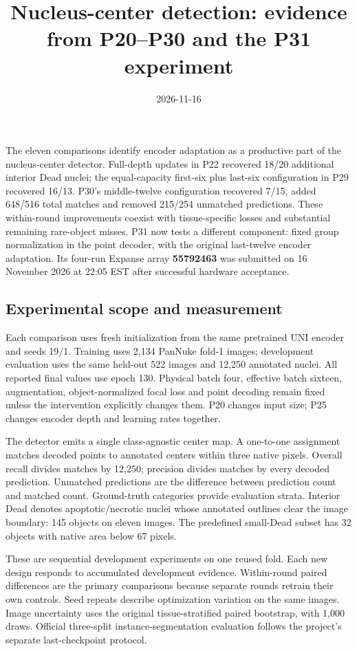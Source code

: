 \documentclass[
  11pt,
]{article}
\title{Nucleus-center detection: evidence from P20--P30 and the P31
experiment}
\author{}
\date{2026-11-16}
\begin{document}
\maketitle

{
\setcounter{tocdepth}{2}
\tableofcontents
}
The eleven comparisons identify encoder adaptation as a productive part
of the nucleus-center detector. Full-depth updates in P22 recovered
18/20 additional interior Dead nuclei; the equal-capacity first-six plus
last-six configuration in P29 recovered 16/13. P30's middle-twelve
configuration recovered 7/15, added 648/516 total matches and removed
215/254 unmatched predictions. These within-round improvements coexist
with tissue-specific losses and substantial remaining rare-object
misses. P31 now tests a different component: fixed group normalization
in the point decoder, with the original last-twelve encoder adaptation.
Its four-run Expanse array \textbf{55792463} was submitted on 16
November 2026 at 22:05 EST after successful hardware acceptance.

\subsection{Experimental scope and
measurement}\label{experimental-scope-and-measurement}

Each comparison uses fresh initialization from the same pretrained UNI
encoder and seeds 19/1. Training uses 2,134 PanNuke fold-1 images;
development evaluation uses the same held-out 522 images and 12,250
annotated nuclei. All reported final values use epoch 130. Physical
batch four, effective batch sixteen, augmentation, object-normalized
focal loss and point decoding remain fixed unless the intervention
explicitly changes them. P20 changes input size; P25 changes encoder
depth and learning rates together.

The detector emits a single class-agnostic center map. A one-to-one
assignment matches decoded points to annotated centers within three
native pixels. Overall recall divides matches by 12,250; precision
divides matches by every decoded prediction. Unmatched predictions are
the difference between prediction count and matched count. Ground-truth
categories provide evaluation strata. Interior Dead denotes
apoptotic/necrotic nuclei whose annotated outlines clear the image
boundary: 145 objects on eleven images. The predefined small-Dead subset
has 32 objects with native area below 67 pixels.

These are sequential development experiments on one reused fold. Each
new design responds to accumulated development evidence. Within-round
paired differences are the primary comparisons because separate rounds
retrain their own controls. Seed repeats describe optimization variation
on the same images. Image uncertainty uses the original
tissue-stratified paired bootstrap, with 1,000 draws. Official
three-split instance-segmentation evaluation follows the project's
separate last-checkpoint protocol.
\end{document}
